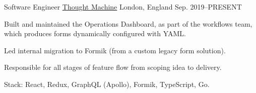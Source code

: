
\begin{cventries}

  \cventry
  {Software Engineer}
  {\href{https://www.thoughtmachine.net/}{Thought Machine}}
  {London, England}
  {Sep. 2019--\textsc{PRESENT}}
  {
    \begin{cvitems}
      \item Built and maintained the Operations Dashboard, as part of the workflows team, which produces forms dynamically configured with YAML.
      \item Led internal migration to Formik (from a custom legacy form solution).
      \item Responsible for all stages of feature flow from scoping idea to delivery.
      \item Stack: React, Redux, GraphQL (Apollo), Formik, TypeScript, Go.
    \end{cvitems}
  }
  {}


\end{cventries}
